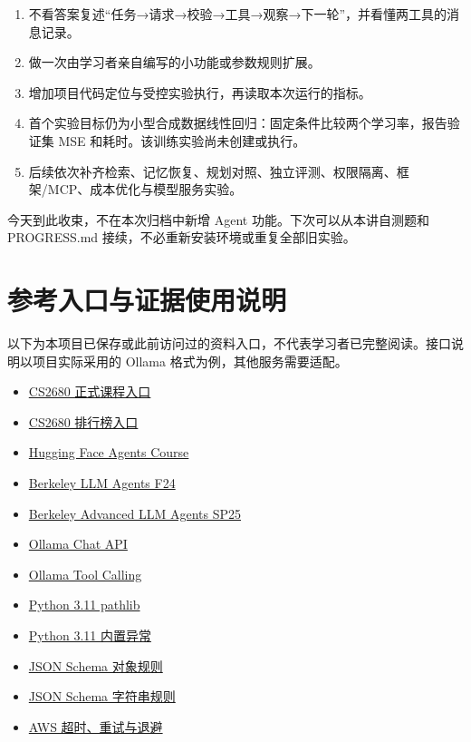 \documentclass[UTF8,zihao=-4,fontset=fandol]{ctexart}
\begin{document}
\begin{enumerate}
\item 不看答案复述“任务→请求→校验→工具→观察→下一轮”，并看懂两工具的消息记录。
\item 做一次由学习者亲自编写的小功能或参数规则扩展。
\item 增加项目代码定位与受控实验执行，再读取本次运行的指标。
\item 首个实验目标仍为小型合成数据线性回归：固定条件比较两个学习率，报告验证集 MSE 和耗时。该训练实验尚未创建或执行。
\item 后续依次补齐检索、记忆恢复、规划对照、独立评测、权限隔离、框架/MCP、成本优化与模型服务实验。
\end{enumerate}

今天到此收束，不在本次归档中新增 Agent 功能。下次可以从本讲自测题和 PROGRESS.md 接续，不必重新安装环境或重复全部旧实验。

\section{参考入口与证据使用说明}

以下为本项目已保存或此前访问过的资料入口，不代表学习者已完整阅读。接口说明以项目实际采用的 Ollama 格式为例，其他服务需要适配。

\begin{itemize}
\item \href{https://cs2680.com/}{CS2680 正式课程入口}
\item \href{https://leaderboard.cs2680.com/}{CS2680 排行榜入口}
\item \href{https://huggingface.co/learn/agents-course/en/unit0/introduction}{Hugging Face Agents Course}
\item \href{https://llmagents-learning.org/f24}{Berkeley LLM Agents F24}
\item \href{https://llmagents-learning.org/sp25}{Berkeley Advanced LLM Agents SP25}
\item \href{https://docs.ollama.com/api/chat}{Ollama Chat API}
\item \href{https://docs.ollama.com/capabilities/tool-calling}{Ollama Tool Calling}
\item \href{https://docs.python.org/3.11/library/pathlib.html}{Python 3.11 pathlib}
\item \href{https://docs.python.org/3.11/library/exceptions.html}{Python 3.11 内置异常}
\item \href{https://json-schema.org/understanding-json-schema/reference/object}{JSON Schema 对象规则}
\item \href{https://json-schema.org/understanding-json-schema/reference/string}{JSON Schema 字符串规则}
\item \href{https://aws.amazon.com/builders-library/timeouts-retries-and-backoff-with-jitter/}{AWS 超时、重试与退避}
\end{itemize}
\end{document}

